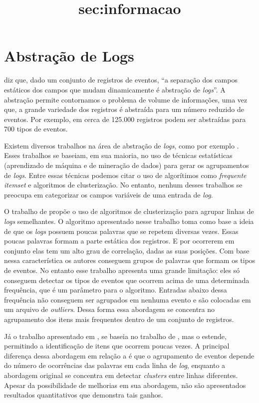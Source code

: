 \documentclass[
	12pt,				%
	openright,			%
	twoside,			%
	a4paper,			%
	english,			%
	spanish,			%
	brazil,				%
	]{abntex2}
\begin{document}
\section{Abstração de Logs}\title{sec:informacao}
\cite{nagappan2010abstracting} diz que, dado um conjunto de registros de eventos, ``a separação dos campos estáticos dos campos que mudam dinamicamente é abstração de \emph{logs}''. A abstração permite contornamos o problema de volume de informações, uma vez que, a grande variedade dos registros é abstraída para um número reduzido de eventos. Por exemplo, em \cite{nagappan2010abstracting} cerca de  125.000 registros podem ser abstraídas para 700 tipos de eventos.

Existem diversos trabalhos na área de abstração de \emph{logs}, como por exemplo \cite{jiang2008automated, nagappan2010abstracting, vaarandi2003data, xu2009detecting}. Esses trabalhos se baseiam, em sua maioria, no uso de técnicas estatísticas (aprendizado de máquina e de mineração de dados) para gerar os agrupamentos de \emph{logs}. Entre essas técnicas podemos citar o uso de algorítimos como \emph{frequente itemset} e algoritmos de clusterização. No entanto, nenhum desses trabalhos se preocupa em categorizar os campos variáveis de uma entrada de \emph{log}.

O trabalho de \cite{vaarandi2003data} propõe o uso de algoritmos de clusterização para agrupar linhas de \emph{logs} semelhantes. O algoritmo apresentado nesse trabalho toma como base a ideia de que os \emph{logs} possuem poucas palavras que se repetem diversas vezes. Essas poucas palavras formam a parte estática dos registros. E por ocorrerem em conjunto elas tem um alto grau de correlação, dadas as suas posições. Com base nessa característica os autores conseguem grupos de palavras que formam os tipos de eventos. No entanto esse trabalho apresenta uma grande limitação: eles só conseguem detectar os tipos de eventos que ocorrem acima de uma determinada frequência, que é um parâmetro para o algoritmo. Entradas abaixo dessa frequência não conseguem ser agrupados em nenhuma evento e são colocadas em um arquivo de \emph{outliers}. Dessa forma essa abordagem se concentra no agrupamento dos itens mais frequentes dentro de um conjunto de registros.

Já o trabalho apresentado em \cite{nagappan2010abstracting}, se baseia no trabalho de \cite{vaarandi2003data}, mas o estende, permitindo a identificação de itens que ocorrem poucas vezes. A principal diferença dessa abordagem em relação a \cite{vaarandi2003data} é que o agrupamento de eventos depende do número de ocorrências das palavras em cada linha de \emph{log}, enquanto a abordagem original se concentra em detectar \emph{clusters} entre linhas diferentes. Apesar da possibilidade de melhorias em sua abordagem, não são apresentados resultados quantitativos que demonstra tais ganhos.
\end{document}
